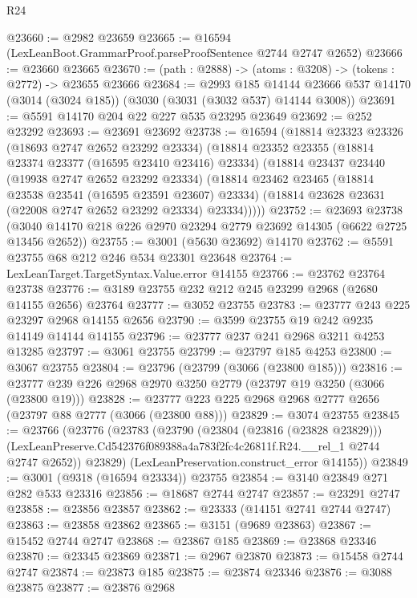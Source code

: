 \begin{lexlean}{R24}
\begin{coremodule}
@23660 := @2982 @23659
@23665 := @16594 (LexLeanBoot.GrammarProof.parseProofSentence @2744 @2747 @2652)
@23666 := @23660 @23665
@23670 := (path : @2888) -> (atoms : @3208) -> (tokens : @2772) -> @23655 @23666
@23684 := @2993
    @185
    @14144
    @23666
    @537
    @14170
    (@3014 (@3024 @185))
    (@3030 (@3031 (@3032 @537) @14144 @3008))
@23691 := @5591 @14170 @204 @22 @227 @535 @23295 @23649
@23692 := @252 @23292
@23693 := @23691 @23692
@23738 := @16594
    (@18814
      @23323
      @23326
      (@18693 @2747 @2652 @23292 @23334)
      (@18814
        @23352
        @23355
        (@18814 @23374 @23377 (@16595 @23410 @23416) @23334)
        (@18814
          @23437
          @23440
          (@19938 @2747 @2652 @23292 @23334)
          (@18814
            @23462
            @23465
            (@18814 @23538 @23541 (@16595 @23591 @23607) @23334)
            (@18814 @23628 @23631 (@22008 @2747 @2652 @23292 @23334) @23334)))))
@23752 := @23693
    @23738
    (@3040 @14170 @218 @226 @2970 @23294 @2779 @23692 @14305 (@6622 @2725 @13456 @2652))
@23755 := @3001 (@5630 @23692) @14170
@23762 := @5591 @23755 @68 @212 @246 @534 @23301 @23648
@23764 := LexLeanTarget.TargetSyntax.Value.error @14155
@23766 := @23762 @23764 @23738
@23776 := @3189 @23755 @232 @212 @245 @23299 @2968 (@2680 @14155 @2656) @23764
@23777 := @3052 @23755
@23783 := @23777 @243 @225 @23297 @2968 @14155 @2656
@23790 := @3599 @23755 @19 @242 @9235 @14149 @14144 @14155
@23796 := @23777 @237 @241 @2968 @3211 @4253 @13285
@23797 := @3061 @23755
@23799 := @23797 @185 @4253
@23800 := @3067 @23755
@23804 := @23796 (@23799 (@3066 (@23800 @185)))
@23816 := @23777 @239 @226 @2968 @2970 @3250 @2779 (@23797 @19 @3250 (@3066 (@23800 @19)))
@23828 := @23777 @223 @225 @2968 @2968 @2777 @2656 (@23797 @88 @2777 (@3066 (@23800 @88)))
@23829 := @3074 @23755
@23845 := @23766
    (@23776
      (@23783
        (@23790
          (@23804 (@23816 (@23828 @23829)))
          (LexLeanPreserve.Cd542376f089388a4a783f2fc4c26811f.R24.__rel_1 @2744 @2747 @2652))
        @23829)
      (LexLeanPreservation.construct_error @14155))
@23849 := @3001 (@9318 (@16594 @23334)) @23755
@23854 := @3140 @23849 @271 @282 @533 @23316
@23856 := @18687 @2744 @2747
@23857 := @23291 @2747
@23858 := @23856 @23857
@23862 := @23333 (@14151 @2741 @2744 @2747)
@23863 := @23858 @23862
@23865 := @3151 (@9689 @23863)
@23867 := @15452 @2744 @2747
@23868 := @23867 @185
@23869 := @23868 @23346
@23870 := @23345 @23869
@23871 := @2967 @23870
@23873 := @15458 @2744 @2747
@23874 := @23873 @185
@23875 := @23874 @23346
@23876 := @3088 @23875
@23877 := @23876 @2968

\end{coremodule}
\end{lexlean}
